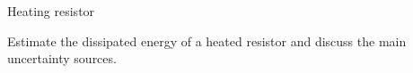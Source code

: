 ﻿\begin{problem}[10]{Heating resistor}
\begin{expcontent}
Estimate the dissipated energy of a heated resistor and discuss the main uncertainty sources.
\end{expcontent}
\end{problem}
